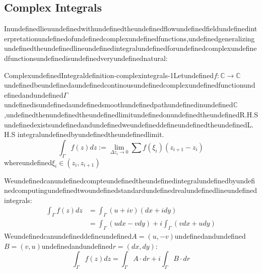 \subsection{Complex Integrals}

Inundefinedlieuundefinedwithundefinedtheundefinedflowundefinedfieldundefinedinterpretationundefinedofundefinedcomplexundefinedfunctions,undefinedgeneralizingundefinedtheundefinedlineundefinedintegralundefinedforundefinedcomplexundefinedfunctionsundefinedisundefinedveryundefinednatural:

\begin{mystthmdefinition}{ComplexundefinedIntegral}{definition-complexintegrals-1}Letundefined$f:\mathbb{C}\to \mathbb{C}$undefinedbeundefinedaundefinedcontinousundefinedcomplexundefinedfunctionundefinedandundefined$\Gamma$undefinedisundefinedaundefinedsmoothundefinedpathundefinedinundefined$\mathbb{C}$,undefinedthenundefinedtheundefinedlimitundefinedonundefinedtheundefinedR.H.SundefinedexistsundefinedandundefinedweundefineddefineundefinedtheundefinedL.H.S
integralundefinedbyundefinedtheundefinedlimit.
\begin{equation}
\int_{\Gamma} f(z)dz:=\lim_{\Delta z_i\to 0}\sum f(\xi_i)(z_{i+1}-z_i)
\end{equation}
whereundefined$\xi_i \in (z_i,z_{i+1})$

\end{mystthmdefinition}
Weundefinedcanundefinedcompteundefinedtheundefinedintegralundefinedbyundefinedcomputingundefinedtwoundefinedstandardundefinedrealundefinedlineundefinedintegrals:
\begin{equation}
\begin{aligned}
\int_{\Gamma} f(z)dz &=\int_{\Gamma} (u+iv)(dx+idy) \\
&=\int_{\Gamma} (udx-vdy) + i\int_{\Gamma} (vdx+udy)
\end{aligned}
\end{equation}
Weundefinedcanundefineddefineundefined$A=(u, -v)$undefinedandundefined$B=(v,u)$undefinedandundefined$r=(dx,dy)$:
\begin{equation}
\int_{\Gamma} f(z)dz = \int_{\Gamma} A\cdot dr + i\int_{\Gamma}B\cdot dr
\end{equation}
